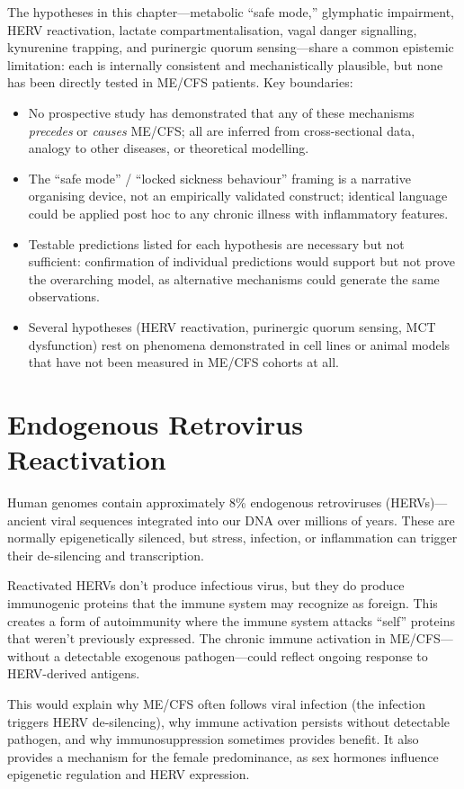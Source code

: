 \begin{limitation}
The hypotheses in this chapter---metabolic ``safe mode,'' glymphatic impairment, HERV reactivation, lactate compartmentalisation, vagal danger signalling, kynurenine trapping, and purinergic quorum sensing---share a common epistemic limitation: each is internally consistent and mechanistically plausible, but none has been directly tested in ME/CFS patients. Key boundaries:
\begin{itemize}
    \item No prospective study has demonstrated that any of these mechanisms \emph{precedes} or \emph{causes} ME/CFS; all are inferred from cross-sectional data, analogy to other diseases, or theoretical modelling.
    \item The ``safe mode'' / ``locked sickness behaviour'' framing is a narrative organising device, not an empirically validated construct; identical language could be applied post hoc to any chronic illness with inflammatory features.
    \item Testable predictions listed for each hypothesis are necessary but not sufficient: confirmation of individual predictions would support but not prove the overarching model, as alternative mechanisms could generate the same observations.
    \item Several hypotheses (HERV reactivation, purinergic quorum sensing, MCT dysfunction) rest on phenomena demonstrated in cell lines or animal models that have not been measured in ME/CFS cohorts at all.
\end{itemize}
\end{limitation}

\section{Endogenous Retrovirus Reactivation}
\label{sec:herv}

\begin{open_question}
Human genomes contain approximately 8\% endogenous retroviruses (HERVs)---ancient viral sequences integrated into our DNA over millions of years. These are normally epigenetically silenced, but stress, infection, or inflammation can trigger their de-silencing and transcription.

Reactivated HERVs don't produce infectious virus, but they do produce immunogenic proteins that the immune system may recognize as foreign. This creates a form of autoimmunity where the immune system attacks ``self'' proteins that weren't previously expressed. The chronic immune activation in ME/CFS---without a detectable exogenous pathogen---could reflect ongoing response to HERV-derived antigens.

This would explain why ME/CFS often follows viral infection (the infection triggers HERV de-silencing), why immune activation persists without detectable pathogen, and why immunosuppression sometimes provides benefit. It also provides a mechanism for the female predominance, as sex hormones influence epigenetic regulation and HERV expression.
\end{open_question}

